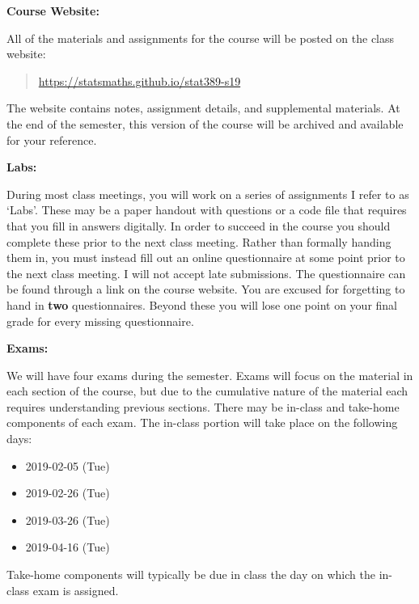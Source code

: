 \documentclass[12pt]{article}
\begin{document}
\bigskip

\textbf{Course Website:} \vspace{6pt}

All of the materials and assignments for the course will be posted
on the class website:
\begin{quote}
\url{https://statsmaths.github.io/stat389-s19}
\end{quote}
The website contains notes, assignment details, and supplemental materials.
At the end of the semester, this version of the course will be archived and
available for your reference.

\vspace{0.4cm}

\textbf{Labs:} \vspace{6pt}

During most class meetings, you will work on a series of assignments I refer
to as `Labs'. These may be a paper handout with questions or a code file that
requires that you fill in answers digitally. In order to succeed in the course
you should complete these prior to the next class meeting. Rather than
formally handing them in, you must instead fill out an online questionnaire
at some point prior to the next class meeting. I will not accept late
submissions. The questionnaire can be found through a link on the course
website. You are excused for forgetting to hand in \textbf{two}
questionnaires. Beyond these you will lose one point on your final grade for
every missing questionnaire.

\vspace{0.4cm}

\textbf{Exams:} \vspace{6pt}

We will have four exams during the semester. Exams will focus on
the material in each section of the course, but due to the cumulative nature
of the material each requires understanding previous sections. There may be
in-class and take-home components of each exam. The in-class portion will take
place on the following days:

\begin{itemize}\setlength\itemsep{0em}
\item 2019-02-05 (Tue)
\item 2019-02-26 (Tue)
\item 2019-03-26 (Tue)
\item 2019-04-16 (Tue)
\end{itemize}

Take-home components will typically be due in class the day on which the
in-class exam is assigned.
\end{document}
